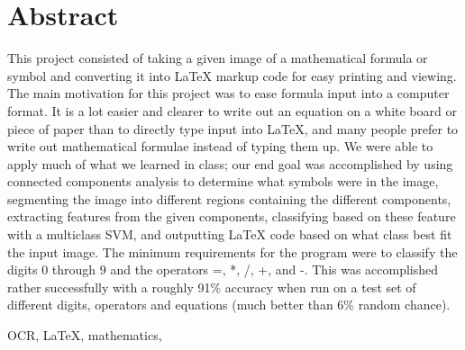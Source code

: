\section{Abstract}
This project consisted of taking a given image of a mathematical formula or symbol and converting it into LaTeX markup code for easy printing and viewing.  The main motivation for this project was to ease formula input into a computer format.  It is a lot easier and clearer to write out an equation on a white board or piece of paper than to directly type input into LaTeX, and many people prefer to write out mathematical formulae instead of typing them up.  We were able to apply much of what we learned in class; our end goal was accomplished by using connected components analysis to determine what symbols were in the image, segmenting the image into different regions containing the different components, extracting features from the given components, classifying based on these feature with a multiclass SVM, and outputting LaTeX code based on what class best fit the input image.  The minimum requirements for the program were to classify the digits 0 through 9 and the operators =, *, /, +, and -.  This was accomplished rather successfully with a roughly 91\% accuracy when run on a test set of different digits, operators and equations (much better than 6\% random chance).

\begin{keywords}
OCR, LaTeX, mathematics, 
\end{keywords}